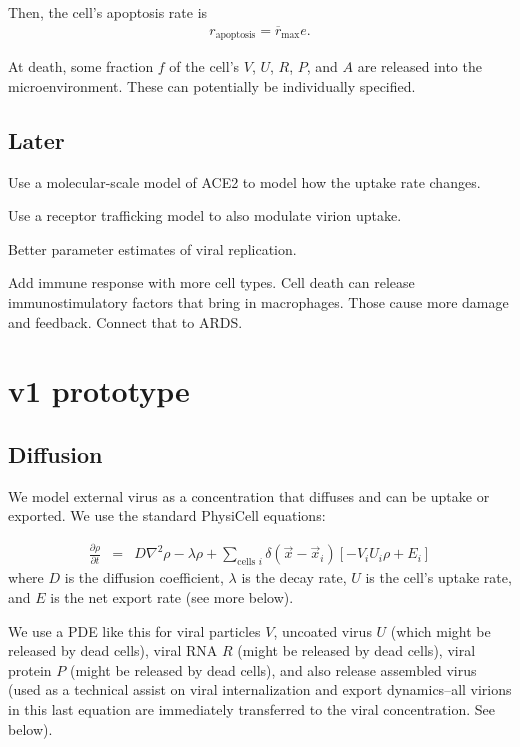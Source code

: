 \documentclass[12point]{article}
\begin{document}
Then, the cell's apoptosis rate is 
\begin{eqnarray}
r_{\textrm{apoptosis}} = \overline{r}_\textrm{max} e. 
\end{eqnarray}

At death, some fraction $f$ of the cell's $V$, $U$, $R$, $P$, and $A$ are released into the microenvironment. These can potentially be individually specified. 

\subsection{Later}
Use a molecular-scale model of ACE2 to model how the uptake rate changes. 

Use a receptor trafficking model to also modulate virion uptake. 

Better parameter estimates of viral replication.

Add immune response with more cell types. Cell death can release immunostimulatory factors that bring in macrophages. Those cause more damage and feedback. Connect that to ARDS. 









\section{v1 prototype}

\subsection{Diffusion}
We model external virus as a concentration that diffuses and can be uptake or exported. We use the standard PhysiCell equations: 

\begin{eqnarray}
\frac{\partial \rho }{\partial t} & = & 
D \nabla^2 \rho - \lambda \rho + 
\sum_{\textrm{cells }i} 
\delta( \vec{x} - \vec{x}_i ) \left[ 
-V_i U_i \rho + E_i 
\right]
\end{eqnarray}
where $D$ is the diffusion coefficient, $\lambda$ is the decay rate, $U$ is the cell's uptake rate, and $E$ is the net export rate (see more below). 

We use a PDE like this for viral particles $V$, uncoated virus $U$ (which might be released by dead cells), viral RNA $R$ (might be released by dead cells), viral protein $P$ (might be released by dead cells), and also 
release assembled virus (used as a technical assist on viral internalization and export dynamics--all virions in this last equation are immediately transferred to the viral concentration. See below). 
\end{document}
